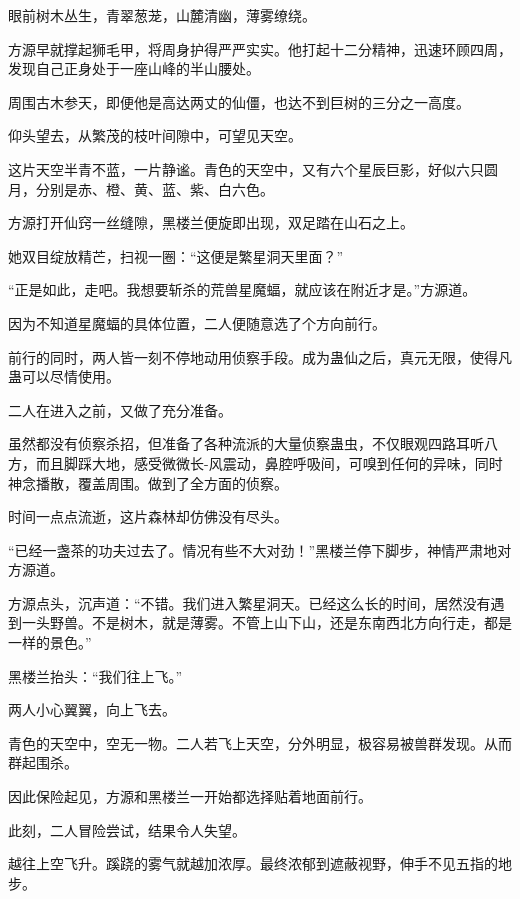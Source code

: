 
\begin{this_body}



眼前树木丛生，青翠葱茏，山麓清幽，薄雾缭绕。

方源早就撑起狮毛甲，将周身护得严严实实。他打起十二分精神，迅速环顾四周，发现自己正身处于一座山峰的半山腰处。

周围古木参天，即便他是高达两丈的仙僵，也达不到巨树的三分之一高度。

仰头望去，从繁茂的枝叶间隙中，可望见天空。

这片天空半青不蓝，一片静谧。青色的天空中，又有六个星辰巨影，好似六只圆月，分别是赤、橙、黄、蓝、紫、白六色。

方源打开仙窍一丝缝隙，黑楼兰便旋即出现，双足踏在山石之上。

她双目绽放精芒，扫视一圈：“这便是繁星洞天里面？”

“正是如此，走吧。我想要斩杀的荒兽星魔蝠，就应该在附近才是。”方源道。

因为不知道星魔蝠的具体位置，二人便随意选了个方向前行。

前行的同时，两人皆一刻不停地动用侦察手段。成为蛊仙之后，真元无限，使得凡蛊可以尽情使用。

二人在进入之前，又做了充分准备。

虽然都没有侦察杀招，但准备了各种流派的大量侦察蛊虫，不仅眼观四路耳听八方，而且脚踩大地，感受微微长-风震动，鼻腔呼吸间，可嗅到任何的异味，同时神念播散，覆盖周围。做到了全方面的侦察。

时间一点点流逝，这片森林却仿佛没有尽头。

“已经一盏茶的功夫过去了。情况有些不大对劲！”黑楼兰停下脚步，神情严肃地对方源道。

方源点头，沉声道：“不错。我们进入繁星洞天。已经这么长的时间，居然没有遇到一头野兽。不是树木，就是薄雾。不管上山下山，还是东南西北方向行走，都是一样的景色。”

黑楼兰抬头：“我们往上飞。”

两人小心翼翼，向上飞去。

青色的天空中，空无一物。二人若飞上天空，分外明显，极容易被兽群发现。从而群起围杀。

因此保险起见，方源和黑楼兰一开始都选择贴着地面前行。

此刻，二人冒险尝试，结果令人失望。

越往上空飞升。蹊跷的雾气就越加浓厚。最终浓郁到遮蔽视野，伸手不见五指的地步。


\end{this_body}
